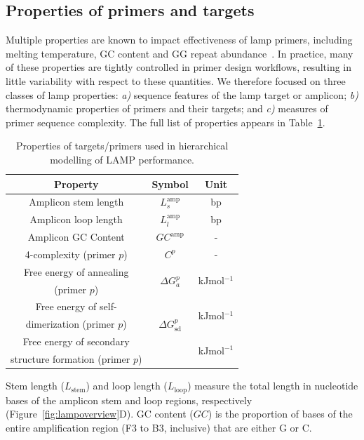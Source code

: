 \documentclass[../thesis.tex]{subfiles}
\begin{document}
\subsection{Properties of primers and targets \label{sec:freeenergy}}
Multiple properties are known to impact effectiveness of \gls{lamp} primers, including melting temperature, GC content and GG repeat abundance~\citep{eiken_primerexplorer_2019}. In practice, many of these properties are tightly controlled in primer design workflows, resulting in little variability with respect to these quantities. We therefore focused on three classes of \gls{lamp} properties: \emph{a)} sequence features of the \gls{lamp} target or amplicon; \emph{b)} thermodynamic properties of primers and their targets; and \emph{c)} measures of primer sequence complexity. The full list of properties appears in Table~\ref{tab:properties}. 
\begin{table}[!t] 
\centering
{\begin{tabular}{ccc}
\hline \textbf{Property} & \textbf{Symbol} &
\textbf{Unit}  \\\hline
Amplicon stem length & $L_s^{\text{amp}}$ & bp  \\
Amplicon loop length & $L_l^{\text{amp}}$ & bp  \\
Amplicon GC Content & $GC^{\text{amp}}$ & -  \\
4-complexity (primer $p$) & $C^p$ & -  \\ 
Free energy of annealing & \multirow{2}{*}{$\Delta G_a^p$} & \multirow{2}{*}{kJmol$^{-1}$}  \\
(primer $p$) &  & \\
Free energy of self- & \multirow{3}{*}{$\Delta G^p_{\text{sd}}$} & \multirow{2}{*}{kJmol$^{-1}$} \\
dimerization (primer $p$)  & &  \\
Free energy of secondary  & \multirow{2}{*}{$\Delta G^p_{\text{ss}}$} & \multirow{2}{*}{kJmol$^{-1}$} \\
structure formation (primer $p$) & &  \\ 
\hline
\end{tabular}}
\caption{Properties of targets/primers used in hierarchical modelling of LAMP performance.\label{tab:properties}} 
\end{table}
Stem length ($L_{\text{stem}}$) and loop length ($L_{\text{loop}}$) measure the total length in nucleotide bases of the amplicon stem and loop regions, respectively (Figure~\ref{fig:lampoverview}D). GC content ($GC$) is the proportion of bases of the entire amplification region (F3 to B3, inclusive) that are either G or C.
\end{document}
